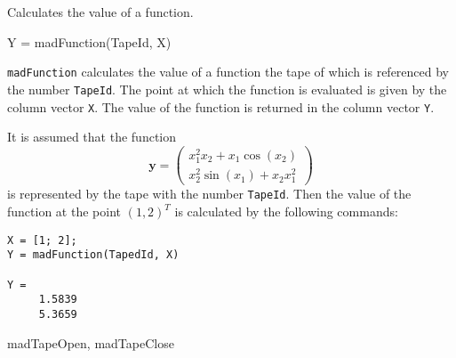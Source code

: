 
\begin{Purpose}
Calculates the value of a function.
\end{Purpose}


\begin{Synopsis}
Y = madFunction(TapeId, X)
\end{Synopsis}


\begin{Description}
\texttt{madFunction} calculates the value of a function the tape of which is referenced by the number \texttt{TapeId}. The point at which the function is evaluated is given by the column vector \texttt{X}. The value of the function is returned in the column vector \texttt{Y}.
\end{Description}

\begin{Examples}
It is assumed that the function
\begin{equation*}
\mathbf{y} = 
\begin{pmatrix}
x_1^2x_2 + x_1\cos(x_2)\\
x_2^2\sin(x_1) + x_2x_1^2
\end{pmatrix}
\end{equation*}
is represented by the tape with the number \texttt{TapeId}. Then the value of the function at the point $(1,2)^T$ is calculated by the following commands:
\begin{verbatim}
X = [1; 2];
Y = madFunction(TapedId, X)

Y =
     1.5839
     5.3659
\end{verbatim}
\end{Examples}

\begin{Seealso}
madTapeOpen, madTapeClose
\end{Seealso}

